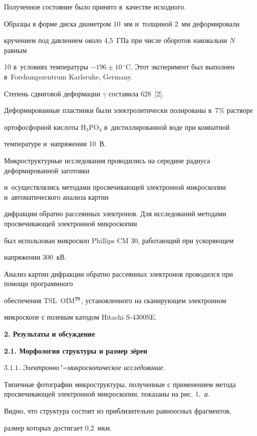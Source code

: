 Полученное состояние было принято в~качестве исходного.



Образцы в форме диска диаметром 10~мм и~толщиной 2~мм деформировали

кручением под давлением около 4,5~ГПа при числе оборотов наковальни $N$ равным

10 в~условиях температуры $-196\pm10$\,$^\circ$C. Этот эксперимент был выполнен в~Forshungs\-zentrum Karlsruhe, Germany.

Степень сдвиговой деформации $\gamma$ составила 628~[2].

Деформированные пластинки были электролитически полированы в~7{\%} растворе

ортофосфорной кислоты H$_{3}$PO$_{4}$ в~дистиллированной воде при комнатной

температуре и~напряжении 10~В.

Микроструктурные исследования проводились на середине радиуса деформированной заготовки

и~осуществлялись методами просвечивающей электронной микроскопии  и~автоматического анализа картин

дифракции обратно рассеянных электронов. Для исследований методами просвечивающей электронной микроскопии

был использован микроскоп Phillips CM 30, работающий при ускоряющем

напряжении 300~кВ.

Анализ картин дифракции обратно рассеянных электронов проводился  при помощи программного

обеспечения TSL~OIM$^{\tt TM}$, установленного на сканирующем электронном

микроскопе с полевым катодом Hitachi S-4300SE.



\textbf{2. Результаты и обсуждение}



\textbf{2.1. Морфология структуры и размер зёрен}



\textit{$3.1.1.$ Электронно"=микроскопическое исследование.}

Типичные фотографии микроструктуры, полученные с применением метода просвечивающей электронной микроскопии, показаны на рис. 1,~{\sl а}.

Видно, что структура состоит из приблизительно равноосных фрагментов,

размер которых достигает 0,2~мкм.


